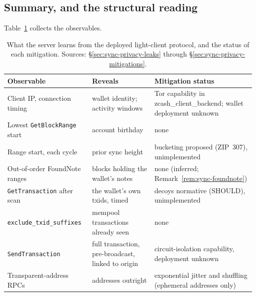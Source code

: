 \documentclass[11pt,a4paper]{article}
\theoremstyle{definition}
\begin{document}
\subsection{Summary, and the structural reading}
\label{sec:sync-privacy-close}

Table~\ref{tab:sync-privacy-summary} collects the observables.

\begin{table}[htbp]
\centering\small
\begin{tabular}{@{}p{}p{}p{}@{}}
\toprule
Observable & Reveals & Mitigation status\\
\midrule
Client IP, connection timing &
wallet identity; activity windows &
Tor capability in \textsf{zcash\_client\_backend}; wallet deployment
unknown\\
\addlinespace
Lowest \texttt{GetBlockRange} start &
account birthday &
none\\
\addlinespace
Range start, each cycle &
prior sync height &
bucketing proposed (ZIP~307), unimplemented\\
\addlinespace
Out-of-order \textsf{FoundNote} ranges &
blocks holding the wallet's notes &
none (inferred; Remark~\ref{rem:sync-foundnote})\\
\addlinespace
\texttt{GetTransaction} after scan &
the wallet's own txids, timed &
decoys normative (SHOULD), unimplemented\\
\addlinespace
\texttt{exclude\_txid\_suffixes} &
mempool transactions already seen &
none\\
\addlinespace
\texttt{SendTransaction} &
full transaction, pre-broadcast, linked to origin &
circuit-isolation capability, deployment unknown\\
\addlinespace
Transparent-address RPCs &
addresses outright &
exponential jitter and shuffling (ephemeral addresses only)\\
\bottomrule
\end{tabular}
\caption{What the server learns from the deployed light-client protocol,
and the status of each mitigation. Sources: \S\ref{sec:sync-privacy-leaks}
through \S\ref{sec:sync-privacy-mitigations}.}
\label{tab:sync-privacy-summary}
\end{table}
\end{document}
